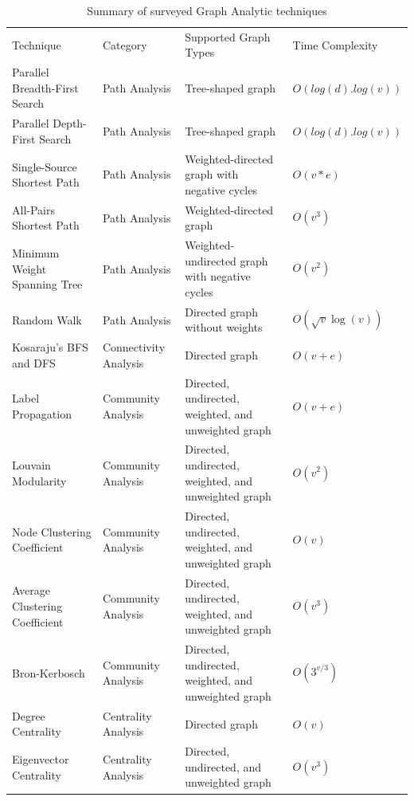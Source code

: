 \documentclass[journal,twoside,web]{ieeecolor}
\begin{document}
\label{sec:discussion}
\begin{table}[]
    \caption{Summary of surveyed Graph Analytic techniques}
    \label{tab:summary}
	\centering
    \begin{tabular}{l l l l}
    \toprule
    \multirow{2}{*}{Technique} & \multirow{2}{*}{Category} & \multirow{2}{*}{Supported Graph Types}  & \multirow{2}{*}{Time Complexity}\\ 
    &&& \\ \midrule
    Parallel Breadth-First Search & Path Analysis & Tree-shaped graph & $O(log(d).log(v))$ \\ \midrule
    Parallel Depth-First Search & Path Analysis & Tree-shaped graph & $O(log(d).log(v))$  \\ \midrule
    Single-Source Shortest Path & Path Analysis & Weighted-directed graph with negative cycles & $O(v * e)$  \\ \midrule
    All-Pairs Shortest Path & Path Analysis & Weighted-directed graph & $O(v^3)$  \\ \midrule
    Minimum Weight Spanning Tree & Path Analysis & Weighted-undirected graph with negative cycles & $O(v^2)$  \\ \midrule
    Random Walk & Path Analysis & Directed graph without weights & $O(\sqrt{v}\log(v))$  \\ \midrule
    Kosaraju's BFS and DFS & Connectivity Analysis & Directed graph & $O(v + e)$  \\ \midrule
    Label Propagation & Community Analysis & Directed, undirected, weighted, and unweighted graph & $O(v + e)$  \\ \midrule
    Louvain Modularity & Community Analysis & Directed, undirected, weighted, and unweighted graph & $O(v^2)$  \\ \midrule
    Node Clustering Coefficient & Community Analysis & Directed, undirected, weighted, and unweighted graph & $O(v)$  \\ \midrule
    Average Clustering Coefficient & Community Analysis & Directed, undirected, weighted, and unweighted graph & $O(v^3)$  \\ \midrule
    Bron-Kerbosch & Community Analysis & Directed, undirected, weighted, and unweighted graph & $O(3^{v/3})$  \\ \midrule
    Degree Centrality & Centrality Analysis & Directed graph & $O(v)$  \\ \midrule
    Eigenvector Centrality & Centrality Analysis & Directed, undirected, and unweighted graph & $O(v^3)$  \\ \midrule

\end{tabular}
\end{table}
\end{document}
